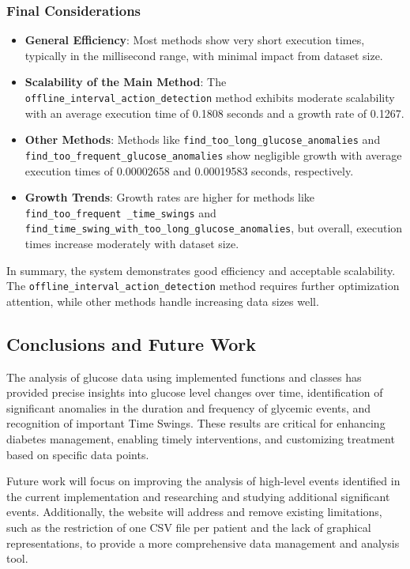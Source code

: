 \documentclass{article}
\begin{document}
\subsubsection{Final Considerations}

\begin{itemize}
    \item \textbf{General Efficiency}: Most methods show very short execution times, typically in the millisecond range, with minimal impact from dataset size.
    \item \textbf{Scalability of the Main Method}: The \texttt{offline\_interval\_action\_detection} method exhibits moderate scalability with an average execution time of 0.1808 seconds and a growth rate of 0.1267.
    \item \textbf{Other Methods}: Methods like \texttt{find\_too\_long\_glucose\_anomalies} and \texttt{find\_too\_frequent\_glucose\_anomalies} show negligible growth with average execution times of 0.00002658 and 0.00019583 seconds, respectively.
    \item \textbf{Growth Trends}: Growth rates are higher for methods like \texttt{find\_too\_frequent
    \_time\_swings} and \texttt{find\_time\_swing\_with\_too\_long\_glucose\_anomalies}, but overall, execution times increase moderately with dataset size.
\end{itemize}

In summary, the system demonstrates good efficiency and acceptable scalability. The \texttt{offline\_interval\_action\_detection} method requires further optimization attention, while other methods handle increasing data sizes well.

\subsection{Conclusions and Future Work}

The analysis of glucose data using implemented functions and classes has provided precise insights into glucose level changes over time, identification of significant anomalies in the duration and frequency of glycemic events, and recognition of important Time Swings. These results are critical for enhancing diabetes management, enabling timely interventions, and customizing treatment based on specific data points.

Future work will focus on improving the analysis of high-level events identified in the current implementation and researching and studying additional significant events. Additionally, the website will address and remove existing limitations, such as the restriction of one CSV file per patient and the lack of graphical representations, to provide a more comprehensive data management and analysis tool.
\end{document}
